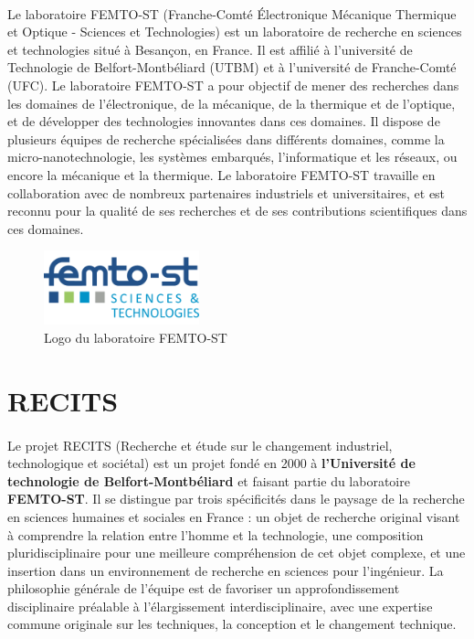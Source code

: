 \paragraph{} \hspace{10mm}
Le laboratoire FEMTO-ST (Franche-Comté Électronique Mécanique Thermique et Optique - Sciences et Technologies) est un laboratoire de recherche en sciences et technologies situé à Besançon, en France. Il est affilié à l'université de Technologie de Belfort-Montbéliard (UTBM) et à l'université de Franche-Comté (UFC). Le laboratoire FEMTO-ST a pour objectif de mener des recherches dans les domaines de l'électronique, de la mécanique, de la thermique et de l'optique, et de développer des technologies innovantes dans ces domaines. Il dispose de plusieurs équipes de recherche spécialisées dans différents domaines, comme la micro-nanotechnologie, les systèmes embarqués, l'informatique et les réseaux, ou encore la mécanique et la thermique. Le laboratoire FEMTO-ST travaille en collaboration avec de nombreux partenaires industriels et universitaires, et est reconnu pour la qualité de ses recherches et de ses contributions scientifiques dans ces domaines.
\begin{figure} [H]
    \centering
    \includegraphics[width=0.4\textwidth]{assets/logo/femto-st.png}
    \caption{Logo du laboratoire FEMTO-ST}
    \label{fig:logoFemto}
\end{figure}

\section{RECITS}
\paragraph{} \hspace{10mm}
Le projet RECITS (Recherche et étude sur le changement industriel, technologique et sociétal) est un projet fondé en 2000 à \textbf{l'Université de technologie de Belfort-Montbéliard} et faisant partie du laboratoire \textbf{FEMTO-ST}. Il se distingue par trois spécificités dans le paysage de la recherche en sciences humaines et sociales en France : un objet de recherche original visant à comprendre la relation entre l'homme et la technologie, une composition pluridisciplinaire pour une meilleure compréhension de cet objet complexe, et une insertion dans un environnement de recherche en sciences pour l'ingénieur. La philosophie générale de l'équipe est de favoriser un approfondissement disciplinaire préalable à l'élargissement interdisciplinaire, avec une expertise commune originale sur les techniques, la conception et le changement technique. 


